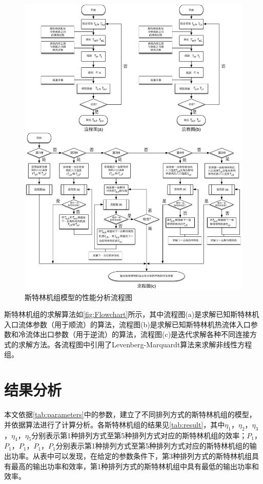 \noindent \begin{figure}[htbp]
\centering
	\includegraphics[width = 1.0\columnwidth]{fig/FlowChart}
	\caption{斯特林机组模型的性能分析流程图}
	\label{fig:Flowchart}
\end{figure}

斯特林机组的求解算法如\autoref{fig:Flowchart}所示，其中流程图(a)是求解已知斯特林机入口流体参数（用于顺流）的算法，流程图(b)是求解已知斯特林机热流体入口参数和冷流体出口参数（用于逆流）的算法，流程图(c)是迭代求解各种不同连接方式的求解方法。各流程图中引用了Levenberg-Marquardt算法来求解非线性方程组。

\section{结果分析}

本文依据\autoref{tab:parameters}中的参数，建立了不同排列方式的斯特林机组的模型，并依据算法进行了计算分析。各斯特林机组的结果见\autoref{tab:result}，其中$\eta_1$，$\eta_2$，$\eta_3$，$\eta_4$，$\eta_5$分别表示第1种排列方式至第5种排列方式对应的斯特林机组的效率；$P_1$，$P_1$，$P_1$，$P_1$，$P_1$分别表示第1种排列方式至第5种排列方式对应的斯特林机组的输出功率。从表中可以发现，在给定的参数条件下，第3种排列方式的斯特林机组具有最高的输出功率和效率，第1种排列方式的斯特林机组中具有最低的输出功率和效率。

